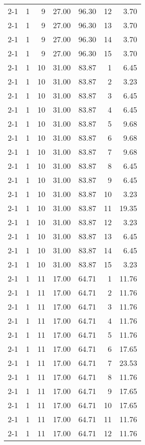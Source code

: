 \begin{tabular}{lrrrrrr}
2-1  & 1 & 9 & 27.00 & 96.30 & 12 & 3.70 \\
2-1  & 1 & 9 & 27.00 & 96.30 & 13 & 3.70 \\
2-1  & 1 & 9 & 27.00 & 96.30 & 14 & 3.70 \\
2-1  & 1 & 9 & 27.00 & 96.30 & 15 & 3.70 \\
2-1  & 1 & 10 & 31.00 & 83.87 & 1 & 6.45 \\
2-1  & 1 & 10 & 31.00 & 83.87 & 2 & 3.23 \\
2-1  & 1 & 10 & 31.00 & 83.87 & 3 & 6.45 \\
2-1  & 1 & 10 & 31.00 & 83.87 & 4 & 6.45 \\
2-1  & 1 & 10 & 31.00 & 83.87 & 5 & 9.68 \\
2-1  & 1 & 10 & 31.00 & 83.87 & 6 & 9.68 \\
2-1  & 1 & 10 & 31.00 & 83.87 & 7 & 9.68 \\
2-1  & 1 & 10 & 31.00 & 83.87 & 8 & 6.45 \\
2-1  & 1 & 10 & 31.00 & 83.87 & 9 & 6.45 \\
2-1  & 1 & 10 & 31.00 & 83.87 & 10 & 3.23 \\
2-1  & 1 & 10 & 31.00 & 83.87 & 11 & 19.35 \\
2-1  & 1 & 10 & 31.00 & 83.87 & 12 & 3.23 \\
2-1  & 1 & 10 & 31.00 & 83.87 & 13 & 6.45 \\
2-1  & 1 & 10 & 31.00 & 83.87 & 14 & 6.45 \\
2-1  & 1 & 10 & 31.00 & 83.87 & 15 & 3.23 \\
2-1  & 1 & 11 & 17.00 & 64.71 & 1 & 11.76 \\
2-1  & 1 & 11 & 17.00 & 64.71 & 2 & 11.76 \\
2-1  & 1 & 11 & 17.00 & 64.71 & 3 & 11.76 \\
2-1  & 1 & 11 & 17.00 & 64.71 & 4 & 11.76 \\
2-1  & 1 & 11 & 17.00 & 64.71 & 5 & 11.76 \\
2-1  & 1 & 11 & 17.00 & 64.71 & 6 & 17.65 \\
2-1  & 1 & 11 & 17.00 & 64.71 & 7 & 23.53 \\
2-1  & 1 & 11 & 17.00 & 64.71 & 8 & 11.76 \\
2-1  & 1 & 11 & 17.00 & 64.71 & 9 & 17.65 \\
2-1  & 1 & 11 & 17.00 & 64.71 & 10 & 17.65 \\
2-1  & 1 & 11 & 17.00 & 64.71 & 11 & 11.76 \\
2-1  & 1 & 11 & 17.00 & 64.71 & 12 & 11.76 \\

\end{tabular}
